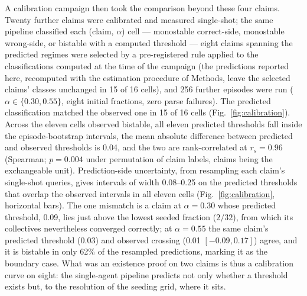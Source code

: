 \documentclass[9pt,twocolumn]{extarticle}
\begin{document}
A calibration campaign then took the comparison beyond these four claims.
Twenty further claims were calibrated and measured single-shot; the same
pipeline classified each (claim, $\alpha$) cell --- monostable correct-side,
monostable wrong-side, or bistable with a computed threshold --- eight claims
spanning the predicted regimes were selected by a pre-registered rule applied
to the classifications computed at the time of the campaign (the predictions
reported here, recomputed with the estimation procedure of Methods, leave the
selected claims' classes unchanged in 15 of 16 cells), and
256 further episodes were run ($\alpha \in \{0.30, 0.55\}$, eight initial
fractions, zero parse failures). The predicted classification matched the
observed one in 15 of 16 cells (Fig.~\ref{fig:calibration}). Across the
eleven cells observed bistable, all eleven predicted thresholds fall inside
the episode-bootstrap intervals, the mean absolute difference between
predicted and observed thresholds is 0.04, and the two are rank-correlated at
$r_s = 0.96$ (Spearman; $p = 0.004$ under permutation of claim labels, claims
being the exchangeable unit). Prediction-side uncertainty, from resampling
each claim's single-shot queries, gives intervals of width 0.08--0.25 on the
predicted thresholds that overlap the observed intervals in all eleven cells
(Fig.~\ref{fig:calibration}, horizontal bars). The one mismatch is a claim at
$\alpha = 0.30$ whose predicted threshold, 0.09, lies just above the lowest
seeded fraction ($2/32$), from which its collectives nevertheless converged
correctly; at $\alpha = 0.55$ the same claim's predicted threshold (0.03) and
observed crossing (0.01 $[-0.09, 0.17]$) agree, and it is bistable in only
62\% of the resampled predictions, marking it as the boundary case. What was
an existence proof on two claims is thus a calibration curve on eight: the
single-agent pipeline predicts not only whether a threshold exists but, to
the resolution of the seeding grid, where it sits.
\end{document}
